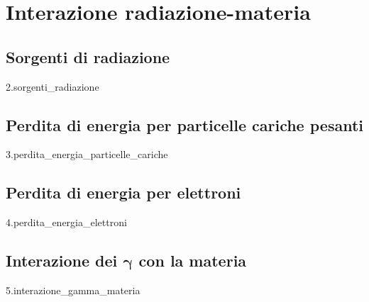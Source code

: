 \documentclass[12pt,openany]{book}
\newcommand\blankpage{%
    \null
    \thispagestyle{empty}%
    \newpage} %
\newcommand{\comment}[1]{}
\begin{document}
\comment{

\part{Tecniche e strumenti di laboratorio}

\chapter{Arduino}
{1.arduino}

\chapter{La tecnologia del vuoto}
{11.tecnologie_vuoto}
\textit{Ho necessità di skippare questo capitolo al momento. Scusate per il disagio.}

}

\thispagestyle{empty}

\part{Interazione radiazione-materia}

\chapter{Sorgenti di radiazione}
{2.sorgenti_radiazione}

\chapter{Perdita di energia per particelle cariche pesanti}
{3.perdita_energia_particelle_cariche}

\afterpage{\blankpage}
\newpage

\chapter{Perdita di energia per elettroni}
{4.perdita_energia_elettroni}

\afterpage{\blankpage}
\newpage

\chapter[Interazione dei \texorpdfstring{$\gamma$}{\textgamma} con la materia]
{Interazione dei $\boldsymbol{\gamma}$ con la materia}
{5.interazione_gamma_materia}
\end{document}
